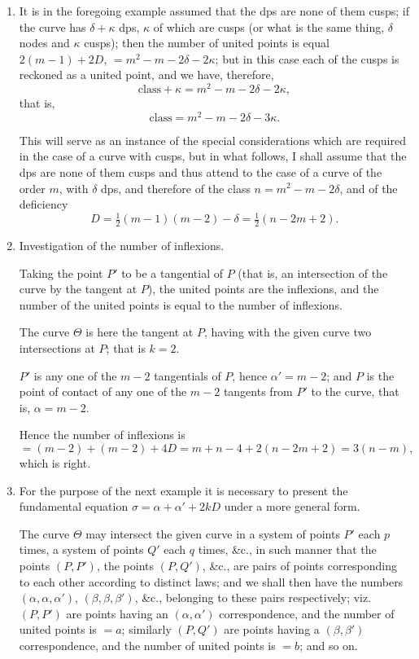 \documentclass[12pt,a4paper]{article}
\theoremstyle{plain}
\theoremstyle{definition}
\theoremstyle{remark}
\begin{document}
\begin{enumerate}[label=\arabic*.]
Hence the class is $= 2(m-1) + 2D$, viz., this is $= (2m - 2) + (m^2 - 3m + 2 - 2\delta)$, which is $= m^2 - m - 2\delta$, as it should be.

\item It is in the foregoing example assumed that the dps are none of them cusps; if the curve has $\delta + \kappa$ dps, $\kappa$ of which are cusps (or what is the same thing, $\delta$ nodes and $\kappa$ cusps); then the number of united points is equal $2(m-1) + 2D$, $= m^2 - m - 2\delta - 2\kappa$; but in this case each of the cusps is reckoned as a united point, and we have, therefore,
\[\text{class} + \kappa = m^2 - m - 2\delta - 2\kappa,\]
that is,
\[\text{class} = m^2 - m - 2\delta - 3\kappa.\]

This will serve as an instance of the special considerations which are required in the case of a curve with cusps, but in what follows, I shall assume that the dps are none of them cusps and thus attend to the case of a curve of the order $m$, with $\delta$ dps, and therefore of the class $n = m^2 - m - 2\delta$, and of the deficiency
\[D = \tfrac{1}{2}(m-1)(m-2) - \delta = \tfrac{1}{2}(n - 2m + 2).\]

\item Investigation of the number of inflexions.

Taking the point $P'$ to be a tangential of $P$ (that is, an intersection of the curve by the tangent at $P$), the united points are the inflexions, and the number of the united points is equal to the number of inflexions.

The curve $\Theta$ is here the tangent at $P$, having with the given curve two intersections at $P$; that is $k = 2$.

$P'$ is any one of the $m - 2$ tangentials of $P$, hence $\alpha' = m - 2$; and $P$ is the point of contact of any one of the $m - 2$ tangents from $P'$ to the curve, that is, $\alpha = m - 2$.

Hence the number of inflexions is
\[= (m-2) + (m-2) + 4D = m + n - 4 + 2(n - 2m + 2) = 3(n - m),\]
which is right.

\item For the purpose of the next example it is necessary to present the fundamental equation $\sigma = \alpha + \alpha' + 2kD$ under a more general form.

The curve $\Theta$ may intersect the given curve in a system of points $P'$ each $p$ times, a system of points $Q'$ each $q$ times, \&c., in such manner that the points $(P, P')$, the points $(P, Q')$, \&c., are pairs of points corresponding to each other according to distinct laws; and we shall then have the numbers $(\alpha, \alpha, \alpha')$, $(\beta, \beta, \beta')$, \&c., belonging to these pairs respectively; viz. $(P, P')$ are points having an $(\alpha, \alpha')$ correspondence, and the number of united points is $= a$; similarly $(P, Q')$ are points having a $(\beta, \beta')$ correspondence, and the number of united points is $= b$; and so on.


\end{enumerate}
\end{document}
